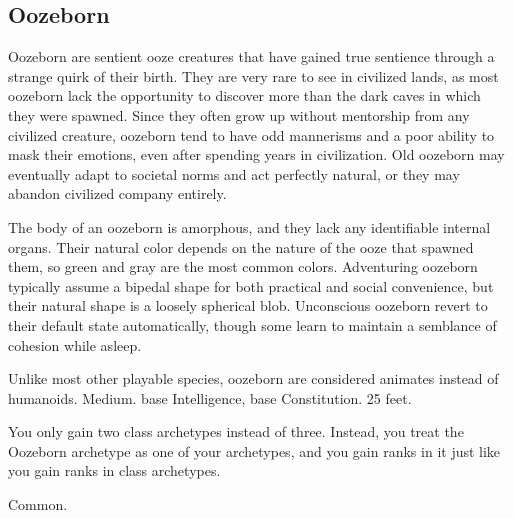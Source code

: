     \subsection{Oozeborn}
        Oozeborn are sentient ooze creatures that have gained true sentience through a strange quirk of their birth.
        They are very rare to see in civilized lands, as most oozeborn lack the opportunity to discover more than the dark caves in which they were spawned.
        Since they often grow up without mentorship from any civilized creature, oozeborn tend to have odd mannerisms and a poor ability to mask their emotions, even after spending years in civilization.
        Old oozeborn may eventually adapt to societal norms and act perfectly natural, or they may abandon civilized company entirely.

        The body of an oozeborn is amorphous, and they lack any identifiable internal organs.
        Their natural color depends on the nature of the ooze that spawned them, so green and gray are the most common colors.
        Adventuring oozeborn typically assume a bipedal shape for both practical and social convenience, but their natural shape is a loosely spherical blob.
        Unconscious oozeborn revert to their default state automatically, though some learn to maintain a semblance of cohesion while asleep.

         Unlike most other playable species, oozeborn are considered animates instead of humanoids.
         Medium.
          base Intelligence,  base Constitution.
         25 feet.
        \begin{itemize}
             You only gain two class archetypes instead of three.
                Instead, you treat the Oozeborn archetype as one of your archetypes, and you gain ranks in it just like you gain ranks in class archetypes.
        \end{itemize}
         Common.
        
